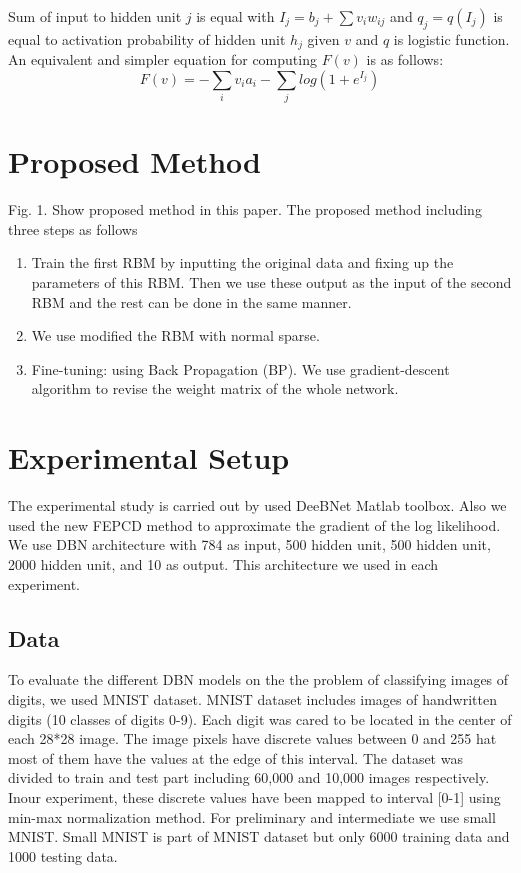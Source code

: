 \documentclass[conference]{IEEEtran}
\begin{document}
Sum of input to hidden unit $j$ is equal with $I_{j}=b_{j}+\sum v_{i}w_{ij}$
and $q_{j}=q(I_{j})$ is equal to activation probability of hidden unit
$h_{j}$ given $v$ and $q$ is logistic function. An equivalent and
simpler equation for computing $F(v)$ is as follows:
\begin{equation}
F(v)=-\sum_{i}v_{i}a_{i}-\sum_{j}log(1+e^{I_{j}})
\end{equation}
\section{Proposed Method}
Fig. 1. Show proposed method in this paper. The proposed
method including three steps as follows
\begin{enumerate}
	\item Train the first RBM by inputting the original data and
	fixing up the parameters of this RBM. Then we use
	these output as the input of the second RBM and the
	rest can be done in the same manner.
	\item We use modified the RBM with normal sparse.
	\item Fine-tuning: using Back Propagation (BP). We use
	gradient-descent algorithm to revise the weight
	matrix of the whole network.
	
\end{enumerate}

\section{Experimental Setup}
The experimental study is carried out by used DeeBNet
Matlab toolbox\cite{keyvanrad3}. Also we used the new FEPCD method to
approximate the gradient of the log likelihood.
We use DBN architecture with 784 as input, 500 hidden
unit, 500 hidden unit, 2000 hidden unit, and 10 as output. This
architecture we used in each experiment.
\subsection{Data}
To evaluate the different DBN models on the the problem
of classifying images of digits, we used MNIST dataset.
MNIST dataset includes images of handwritten digits\cite{lecun} (10
classes of digits 0-9). Each digit was cared to be located in the
center of each 28*28 image. The image pixels have discrete
values between 0 and 255 hat most of them have the values at
the edge of this interval. The dataset was divided to train and
test part including 60,000 and 10,000 images respectively. Inour experiment, these discrete values have been mapped to
interval [0-1] using min-max normalization method. For
preliminary and intermediate we use small MNIST. Small
MNIST is part of MNIST dataset but only 6000 training data
and 1000 testing data.
\end{document}
